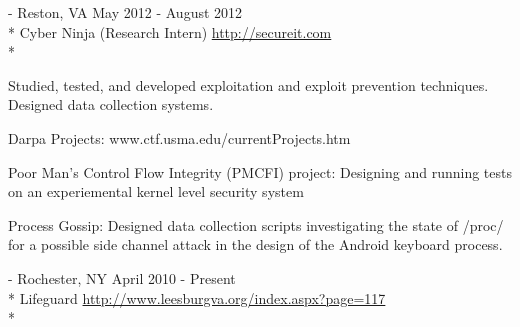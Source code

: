 \documentclass[letter,margin,line]{resume}
\newcommand{\rurl}[1]{\hfill {\footnotesize \url{#1}}}
\newcommand{\rdate}[1]{\hfill {\small #1}}
\renewcommand{\employer}[5]{\item[#1] - #2 \rdate{#3} \\* #4 \rurl{#5} \\*}
\begin{document}
\begin{resume}
\begin{asparadesc}
		\employer{SecureIT}{Reston, VA}{May 2012 - August 2012}{Cyber Ninja (Research Intern)}{http://secureit.com}

		\small
		Studied, tested, and developed exploitation and exploit prevention techniques. Designed data collection systems.
		\item Darpa Projects: \hfill www.ctf.usma.edu/currentProjects.htm
			\item Poor Man’s Control Flow Integrity (PMCFI) project: Designing and running tests on an experiemental kernel level security system
			\item Process Gossip: Designed data collection scripts investigating the state of /proc/ for a possible side channel attack in the design of the Android keyboard process.
		\normalsize
		\\
	        \employer{Town of Leesburg, Parks and Recreation}{Rochester, NY}{April 2010 - Present}{Lifeguard}{http://www.leesburgva.org/index.aspx?page=117}
		\normalsize
		\\
	\end{asparadesc}


\end{resume}
\end{document}
